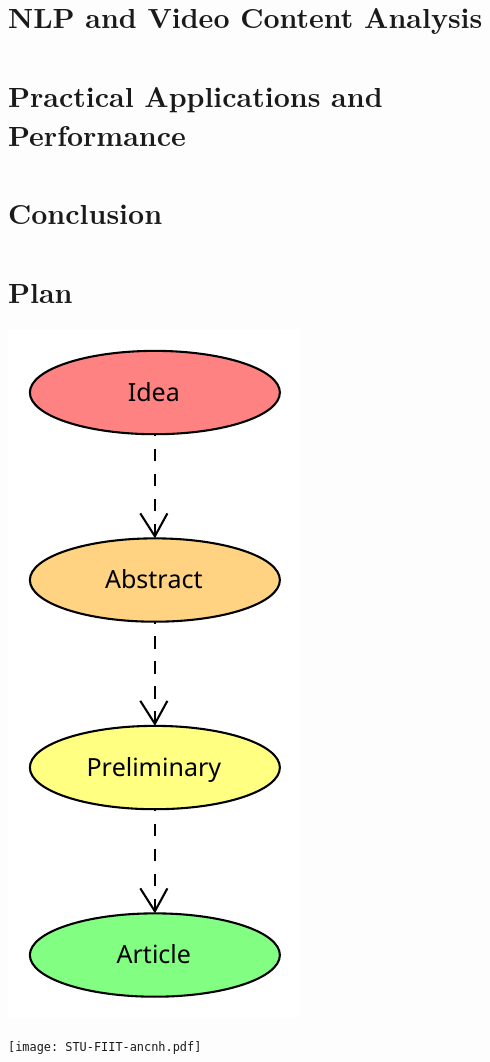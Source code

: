\documentclass[12pt,english,a4paper]{article}
\begin{document}
\section{NLP and Video Content Analysis}

\section{Practical Applications and Performance}

\section{Conclusion}

\section{Plan}
\begin{center}
    \includegraphics[scale=1,]{Plan.pdf}
\end{center}

\begin{center}
    \texttt{[image: STU-FIIT-ancnh.pdf]}
\end{center}

\newpage

\printbibliography
\end{document}
